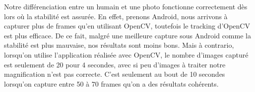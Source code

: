 Notre différenciation entre un humain et une photo fonctionne correctement dès lors où la stabilité est assurée. En effet, prenons Android, nous arrivons
à capturer plus de frames qu'en utilisant OpenCV, toutefois le tracking d'OpenCV est plus efficace. De ce fait, malgré une meilleure capture sous Android
comme la stabilité est plus mauvaise, nos résultats sont moins bons. Mais à contrario, lorsqu'on utilise l'application réalisée avec OpenCV, le nombre d'images
capturé est seulement de 20 pour 4 secondes, avec si peu d'images à traiter notre magnification n'est pas correcte. C'est seulement au bout de 10 secondes
lorsqu'on capture entre 50 à 70 frames qu'on a des résultats cohérents.

